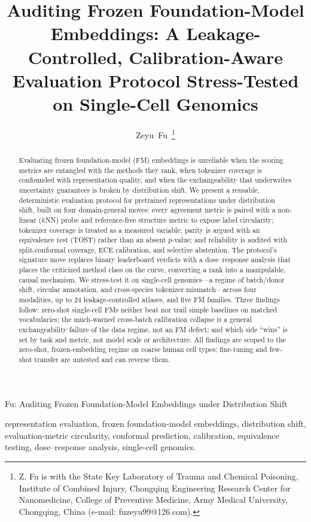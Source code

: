 \documentclass[journal]{IEEEtran}
\begin{document}
\title{Auditing Frozen Foundation-Model Embeddings: A Leakage-Controlled, Calibration-Aware Evaluation Protocol Stress-Tested on Single-Cell Genomics}
\author{Zeyu~Fu\,%
\thanks{Z. Fu is with the State Key Laboratory of Trauma and Chemical Poisoning, Institute of Combined Injury, Chongqing Engineering Research Center for Nanomedicine, College of Preventive Medicine, Army Medical University, Chongqing, China (e-mail: fuzeyu99@126.com).}}
%
{Fu: Auditing Frozen Foundation-Model Embeddings under Distribution Shift}

\maketitle
\begin{abstract}
Evaluating frozen foundation-model (FM) embeddings is unreliable when the scoring metrics are entangled with the methods they rank, when tokenizer coverage is confounded with representation quality, and when the exchangeability that underwrites uncertainty guarantees is broken by distribution shift. We present a reusable, deterministic evaluation protocol for pretrained representations under distribution shift, built on four domain-general moves: every agreement metric is paired with a non-linear ($k$NN) probe and reference-free structure metric to expose label circularity; tokenizer coverage is treated as a measured variable; parity is argued with an equivalence test (TOST) rather than an absent $p$-value; and reliability is audited with split-conformal coverage, ECE calibration, and selective abstention. The protocol's signature move replaces binary leaderboard verdicts with a dose--response analysis that places the criticized method class on the curve, converting a rank into a manipulable, causal mechanism. We stress-test it on single-cell genomics---a regime of batch/donor shift, circular annotation, and cross-species tokenizer mismatch---across four modalities, up to 24 leakage-controlled atlases, and five FM families. Three findings follow: zero-shot single-cell FMs neither beat nor trail simple baselines on matched vocabularies; the much-warned cross-batch calibration collapse is a general exchangeability failure of the data regime, not an FM defect; and which side ``wins'' is set by task and metric, not model scale or architecture. All findings are scoped to the zero-shot, frozen-embedding regime on coarse human cell types; fine-tuning and few-shot transfer are untested and can reverse them.
\end{abstract}
\begin{IEEEkeywords}
representation evaluation, frozen foundation-model embeddings, distribution shift, evaluation-metric circularity, conformal prediction, calibration, equivalence testing, dose--response analysis, single-cell genomics.
\end{IEEEkeywords}
\IEEEpeerreviewmaketitle
\end{document}
